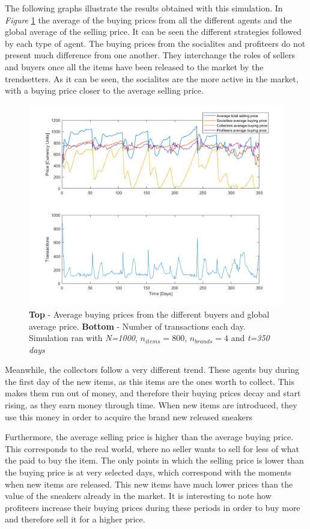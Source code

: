 \documentclass[12pt]{article}
\begin{document}
The following graphs illustrate the results obtained with this simulation. In \textit{Figure} \ref{Avgp_Nom} the average of the buying prices from all the different agents and the global average of the selling price. It can be seen the different strategies followed by each type of agent. The buying prices from the socialites and profiteers do not present much difference from one another. They interchange the roles of sellers and buyers once all the items have been released to the market by the trendsetters. As it can be seen, the socialites are the more active in the market, with a buying price closer to the average selling price.

\begin{figure}
    \centering
    \includegraphics[width=0.6\columnwidth]{Nominal_Out/Avrg-prcs2nom.png}
    \caption{\textbf{Top} - Average buying prices from the different buyers and global average price. \textbf{Bottom} - Number of transactions each day. Simulation ran with \textit{N=1000}, \textit{$n_{items}=800$}, \textit{$n_{brands}=4$} and \textit{t=350 days}}
    \label{Avgp_Nom}
\end{figure}

Meanwhile, the collectors follow a very different trend. These agents buy during the first day of the new items, as this items are the ones worth to collect. This makes them run out of money, and therefore their buying prices decay and start rising, as they earn money through time. When new items are introduced, they use this money in order to acquire the brand new released sneakers

Furthermore, the average selling price is higher than the average buying price. This corresponds to the real world, where no seller wants to sell for less of what the paid to buy the item. The only points in which the selling price is lower than the buying price is at very selected days, which correspond with the moments when new items are released. This new items have much lower prices than the value of the sneakers already in the market. It is interesting to note how profiteers increase their buying prices during these periods in order to buy more and therefore sell it for a higher price.
\end{document}
